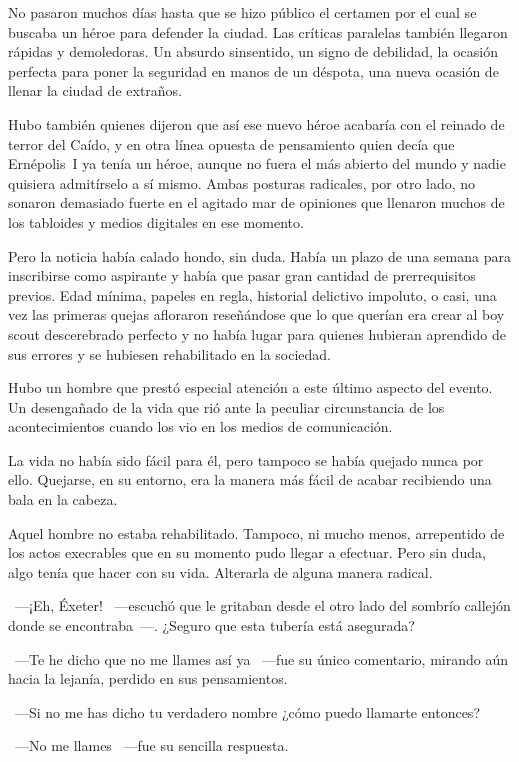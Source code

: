 \parbreak
No pasaron muchos días hasta que se hizo público el certamen por el cual se buscaba un héroe para defender la ciudad. Las críticas paralelas también llegaron rápidas y demoledoras. Un absurdo sinsentido, un signo de debilidad, la ocasión perfecta para poner la seguridad en manos de un déspota, una nueva ocasión de llenar la ciudad de extraños.

Hubo también quienes dijeron que así ese nuevo héroe acabaría con el reinado de terror del Caído, y en otra línea opuesta de pensamiento quien decía que Ernépolis~I ya tenía un héroe, aunque no fuera el más abierto del mundo y nadie quisiera admitírselo a sí mismo. Ambas posturas radicales, por otro lado, no sonaron demasiado fuerte en el agitado mar de opiniones que llenaron muchos de los tabloides y medios digitales en ese momento.

Pero la noticia había calado hondo, sin duda. Había un plazo de una semana para inscribirse como aspirante y había que pasar gran cantidad de prerrequisitos previos. Edad mínima, papeles en regla, historial delictivo impoluto, o casi, una vez las primeras quejas afloraron reseñándose que lo que querían era crear al boy scout descerebrado perfecto y no había lugar para quienes hubieran aprendido de sus errores y se hubiesen rehabilitado en la sociedad.

Hubo un hombre que prestó especial atención a este último aspecto del evento. Un desengañado de la vida que rió ante la peculiar circunstancia de los acontecimientos cuando los vio en los medios de comunicación.

La vida no había sido fácil para él, pero tampoco se había quejado nunca por ello. Quejarse, en su entorno, era la manera más fácil de acabar recibiendo una bala en la cabeza.

Aquel hombre no estaba rehabilitado. Tampoco, ni mucho menos, arrepentido de los actos execrables que en su momento pudo llegar a efectuar. Pero sin duda, algo tenía que hacer con su vida. Alterarla de alguna manera radical.

~---¡Eh, Éxeter! ~---escuchó que le gritaban desde el otro lado del sombrío callejón donde se encontraba~---. ¿Seguro que esta tubería está asegurada?

~---Te he dicho que no me llames así ya ~---fue su único comentario, mirando aún hacia la lejanía, perdido en sus pensamientos.

~---Si no me has dicho tu verdadero nombre ¿cómo puedo llamarte entonces?

~---No me llames ~---fue su sencilla respuesta.

